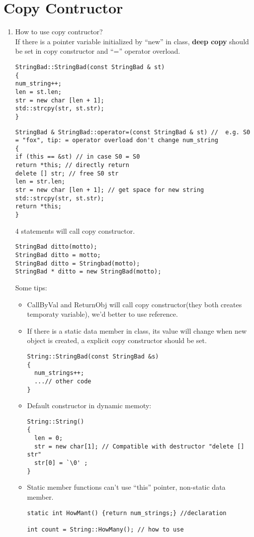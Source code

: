 \documentclass[10pt,a4paper,oneside]{article}
\begin{document}
\section{Copy Contructor}
\begin{enumerate}[1.]
\item How to use copy contructor?\\
If there is a pointer variable initialized by ``new'' in class, {\bfseries deep copy} should be set in copy constructor and ``='' operator overload.
\begin{lstlisting}
StringBad::StringBad(const StringBad & st)
{
num_string++;
len = st.len;
str = new char [len + 1];
std::strcpy(str, st.str);
}
\end{lstlisting}
\begin{lstlisting}
StringBad & StringBad::operator=(const StringBad & st) //  e.g. S0 = "fox", tip: = operator overload don't change num_string
{
if (this == &st) // in case S0 = S0
return *this; // directly return
delete [] str; // free S0 str
len = str.len;
str = new char [len + 1]; // get space for new string
std::strcpy(str, st.str);
return *this;
}
\end{lstlisting}
4 statements will call copy constructor.
\begin{lstlisting}
StringBad ditto(motto);
StringBad ditto = motto;
StringBad ditto = Stringbad(motto);
StringBad * ditto = new StringBad(motto);
\end{lstlisting}
Some tips:
\begin{itemize}
\item CallByVal and ReturnObj will call copy constructor(they both creates temporaty variable), we'd better to use reference.
\item If there is a static data member in class, its value will change when new object is created, a explicit copy constructor should be set.
\begin{lstlisting}
String::StringBad(const StringBad &s)
{
  num_strings++;
  ...// other code
}
\end{lstlisting}
\item Default constructor in dynamic memoty:
\begin{lstlisting}
String::String()
{
  len = 0;
  str = new char[1]; // Compatible with destructor "delete [] str"
  str[0] = `\0' ;
}
\end{lstlisting}
\item Static member functions can't use ``this'' pointer, non-static data member.
\begin{lstlisting}
static int HowMant() {return num_strings;} //declaration

int count = String::HowMany(); // how to use
\end{lstlisting}
\end{itemize}
\end{enumerate}
\end{document}
